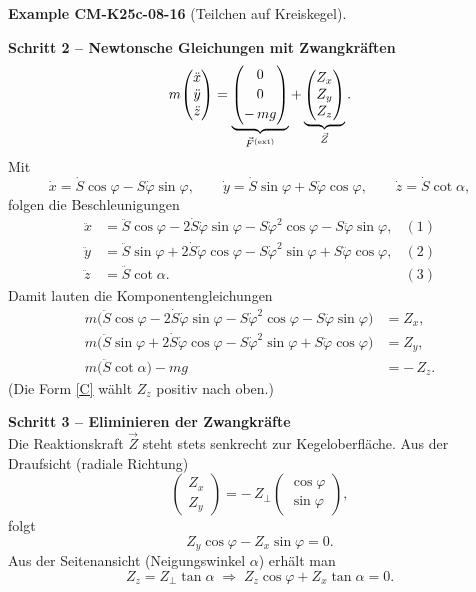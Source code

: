 \documentclass[10pt, letterpaper]{article}
\newcommand{\CustomHeading}[3]{%
  \par\medskip\noindent%
  \textbf{#1 #2} \textnormal{(#3)}.\enskip%
}
\newenvironment{EXA}[2]{\CustomHeading{Example}{#1}{#2}}{}
\begin{document}
\begin{EXA}{CM-K25c-08-16}{Teilchen auf Kreiskegel}
\textbf{Schritt 2 – Newtonsche Gleichungen mit Zwangkräften}\\
\[
  m\!
  \begin{pmatrix}
    \ddot x\\ \ddot y\\ \ddot z
  \end{pmatrix}
  =
  \underbrace{%
  \begin{pmatrix}
    0\\[2pt] 0\\[2pt] -\,mg
  \end{pmatrix}}_{\vec F^{\text{(ext)}}}
  +
  \underbrace{%
  \begin{pmatrix}
    Z_x\\ Z_y\\ Z_z
  \end{pmatrix}}_{\vec Z}.
\]
Mit
\[
  \dot x = \dot S\cos\varphi - S\dot\varphi\sin\varphi,\qquad
  \dot y = \dot S\sin\varphi + S\dot\varphi\cos\varphi,\qquad
  \dot z = \dot S\cot\alpha,
\]
folgen die Beschleunigungen
\begin{align}
  \ddot x &= \ddot S\cos\varphi - 2\dot S\dot\varphi\sin\varphi
             - S\dot\varphi^{2}\cos\varphi - S\ddot\varphi\sin\varphi,
             &(1)\nonumber\\[2pt]
  \ddot y &= \ddot S\sin\varphi + 2\dot S\dot\varphi\cos\varphi
             - S\dot\varphi^{2}\sin\varphi + S\ddot\varphi\cos\varphi,
             &(2)\nonumber\\[2pt]
  \ddot z &= \ddot S\cot\alpha. &(3)\nonumber
\end{align}
Damit lauten die Komponenten­gleichungen
\begin{align}
  m\bigl(\ddot S\cos\varphi - 2\dot S\dot\varphi\sin\varphi
        - S\dot\varphi^{2}\cos\varphi - S\ddot\varphi\sin\varphi\bigr) &= Z_x, \tag{A}\\[2pt]
  m\bigl(\ddot S\sin\varphi + 2\dot S\dot\varphi\cos\varphi
        - S\dot\varphi^{2}\sin\varphi + S\ddot\varphi\cos\varphi\bigr) &= Z_y, \tag{B}\\[2pt]
  m\bigl(\ddot S\cot\alpha\bigr) - mg &= -\,Z_z. \tag{C}
\end{align}
(Die Form \eqref{C} wählt $Z_z$ positiv nach oben.)

\textbf{Schritt 3 – Eliminieren der Zwangkräfte}\\
Die Reaktionskraft $\vec Z$ steht stets senkrecht zur Kegeloberfläche.  
Aus der Draufsicht (radiale Richtung)
\[
  \begin{pmatrix} Z_x\\ Z_y \end{pmatrix}
    = -\,Z_\perp\!\begin{pmatrix}\cos\varphi\\ \sin\varphi\end{pmatrix},
\]
folgt
\[
  Z_y\cos\varphi - Z_x\sin\varphi = 0. \tag{D}
\]
Aus der Seitenansicht (Neigungswinkel $\alpha$) erhält man
\[
  Z_z = Z_\perp\tan\alpha
  \;\Longrightarrow\;
  Z_z\cos\varphi + Z_x\tan\alpha = 0. \tag{E}
\]


\end{EXA}
\end{document}
